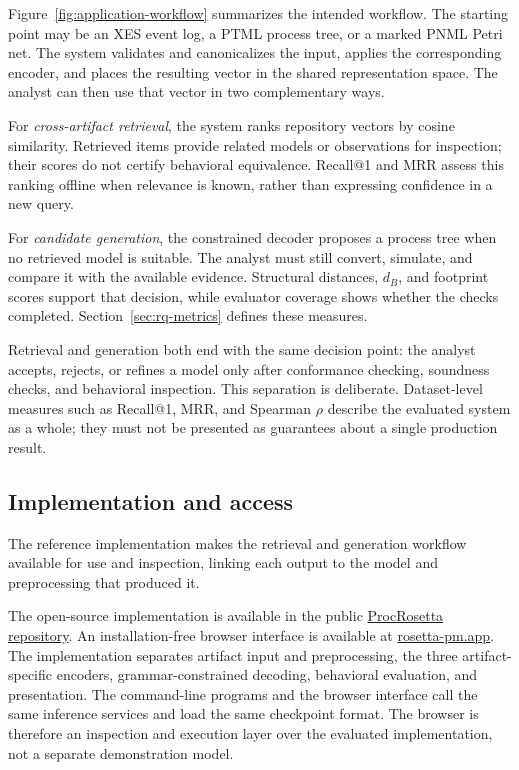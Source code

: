 \documentclass[mathematics,article,submit,moreauthors]{Definitions/mdpi}
\begin{document}
Figure~\ref{fig:application-workflow} summarizes the intended workflow. The starting point may be an XES event log, a PTML process tree, or a marked PNML Petri net. The system validates and canonicalizes the input, applies the corresponding encoder, and places the resulting vector in the shared representation space. The analyst can then use that vector in two complementary ways.

For \emph{cross-artifact retrieval}, the system ranks repository vectors by cosine similarity. Retrieved items provide related models or observations for inspection; their scores do not certify behavioral equivalence. Recall@1 and MRR assess this ranking offline when relevance is known, rather than expressing confidence in a new query.

For \emph{candidate generation}, the constrained decoder proposes a process tree when no retrieved model is suitable. The analyst must still convert, simulate, and compare it with the available evidence. Structural distances, $d_B$, and footprint scores support that decision, while evaluator coverage shows whether the checks completed. Section~\ref{sec:rq-metrics} defines these measures.



Retrieval and generation both end with the same decision point: the analyst accepts, rejects, or refines a model only after conformance checking, soundness checks, and behavioral inspection. This separation is deliberate. Dataset-level measures such as Recall@1, MRR, and Spearman $\rho$ describe the evaluated system as a whole; they must not be presented as guarantees about a single production result.

\subsection{Implementation and access}

The reference implementation makes the retrieval and generation workflow available for use and inspection, linking each output to the model and preprocessing that produced it.

The open-source implementation is available in the public \href{https://github.com/fit-alessandro-berti/proc-rosetta}{ProcRosetta repository}. An installation-free browser interface is available at \href{https://rosetta-pm.app}{rosetta-pm.app}. The implementation separates artifact input and preprocessing, the three artifact-specific encoders, grammar-constrained decoding, behavioral evaluation, and presentation. The command-line programs and the browser interface call the same inference services and load the same checkpoint format. The browser is therefore an inspection and execution layer over the evaluated implementation, not a separate demonstration model.
\end{document}
